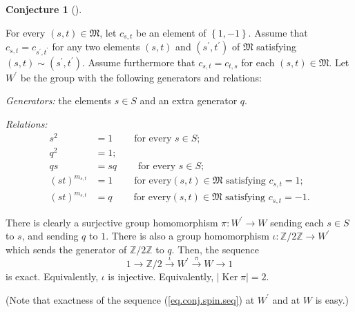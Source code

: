 \documentclass[numbers=enddot,12pt,final,onecolumn,notitlepage,abstracton]{scrartcl}%
\theoremstyle{definition}
\newtheorem{conj}[theo]{Conjecture}
\newenvironment{conjecture}[1][]
{\begin{conj}[#1]\begin{leftbar}}
{\end{leftbar}\end{conj}}
\begin{document}
\begin{conjecture}
\label{conj.spin}For every $\left(  s,t\right)  \in\mathfrak{M}$, let
$c_{s,t}$ be an element of $\left\{  1,-1\right\}  $. Assume that
$c_{s,t}=c_{s^{\prime},t^{\prime}}$ for any two elements $\left(  s,t\right)
$ and $\left(  s^{\prime},t^{\prime}\right)  $ of $\mathfrak{M}$ satisfying
$\left(  s,t\right)  \sim\left(  s^{\prime},t^{\prime}\right)  $. Assume
furthermore that $c_{s,t}=c_{t,s}$ for each $\left(  s,t\right)
\in\mathfrak{M}$. Let $W^{\prime}$ be the group with the following generators
and relations:

\textit{Generators:} the elements $s\in S$ and an extra generator $q$.

\textit{Relations:}%
\begin{align*}
s^{2}  &  =1\ \ \ \ \ \ \ \ \ \ \text{for every }s\in S;\\
q^{2}  &  =1;\\
qs  &  =sq\ \ \ \ \ \ \ \ \ \ \text{for every }s\in S;\\
\left(  st\right)  ^{m_{s,t}}  &  =1\ \ \ \ \ \ \ \ \ \ \text{for every
}\left(  s,t\right)  \in\mathfrak{M}\text{ satisfying }c_{s,t}=1;\\
\left(  st\right)  ^{m_{s,t}}  &  =q\ \ \ \ \ \ \ \ \ \ \text{for every
}\left(  s,t\right)  \in\mathfrak{M}\text{ satisfying }c_{s,t}=-1.
\end{align*}


There is clearly a surjective group homomorphism $\pi:W^{\prime}\rightarrow W$
sending each $s\in S$ to $s$, and sending $q$ to $1$. There is also a group
homomorphism $\iota:\mathbb{Z}/2\mathbb{Z}\rightarrow W^{\prime}$ which sends
the generator of $\mathbb{Z}/2\mathbb{Z}$ to $q$. Then, the sequence%
\begin{equation}
1\longrightarrow\mathbb{Z}/2\overset{\iota}{\longrightarrow}W^{\prime
}\overset{\pi}{\longrightarrow}W\longrightarrow1\label{eq.conj.spin.seq}%
\end{equation}
is exact. Equivalently, $\iota$ is injective. Equivalently, $\left\vert
\operatorname*{Ker}\pi\right\vert =2$.
\end{conjecture}

(Note that exactness of the sequence (\ref{eq.conj.spin.seq}) at $W^{\prime}$
and at $W$ is easy.)
\end{document}
